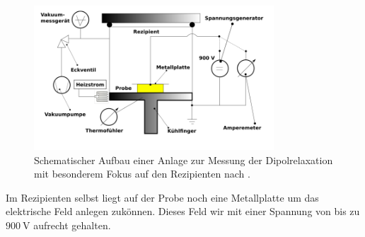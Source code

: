 \begin{figure}
    \centering
    \includegraphics[width=0.8\textwidth]{bilder/aufbau2.png}
    \caption{Schematischer Aufbau einer Anlage zur Messung der Dipolrelaxation mit 
            besonderem Fokus auf den Rezipienten nach 
            \cite{skript}.}
    \label{fig:aufbau2}
\end{figure}


Im Rezipienten selbst liegt auf der Probe noch eine Metallplatte um das elektrische Feld anlegen zukönnen.
Dieses Feld wir mit einer Spannung von bis zu $\SI{900}{\volt}$ aufrecht gehalten.
\\
\newline
